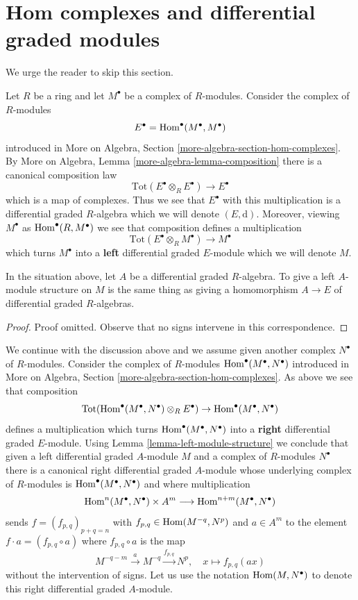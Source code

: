 \section{Hom complexes and differential graded modules}
\label{section-hom-complexes}

\noindent
We urge the reader to skip this section.

\medskip\noindent
Let $R$ be a ring and let $M^\bullet$ be a complex of $R$-modules.
Consider the complex of $R$-modules
$$
E^\bullet = \mathop{\mathrm{Hom}}\nolimits^\bullet(M^\bullet, M^\bullet)
$$
introduced in
More on Algebra, Section \ref{more-algebra-section-hom-complexes}.
By More on Algebra, Lemma \ref{more-algebra-lemma-composition}
there is a canonical composition law
$$
\text{Tot}(E^\bullet \otimes_R E^\bullet) \to E^\bullet
$$
which is a map of complexes. Thus we see that $E^\bullet$ with this
multiplication is a differential graded $R$-algebra which we will
denote $(E, \text{d})$. Moreover, viewing $M^\bullet$ as
$\mathop{\mathrm{Hom}}\nolimits^\bullet(R, M^\bullet)$ we see that composition defines a multiplication
$$
\text{Tot}(E^\bullet \otimes_R M^\bullet) \to M^\bullet
$$
which turns $M^\bullet$ into a {\bf left} differential graded $E$-module
which we will denote $M$.

\begin{lemma}
\label{lemma-left-module-structure}
In the situation above, let $A$ be a differential graded $R$-algebra.
To give a left $A$-module structure on $M$ is the same thing as
giving a homomorphism $A \to E$ of differential graded $R$-algebras.
\end{lemma}

\begin{proof}
Proof omitted. Observe that no signs intervene in this correspondence.
\end{proof}

\noindent
We continue with the discussion above and we assume given another
complex $N^\bullet$ of $R$-modules. Consider the complex
of $R$-modules $\mathop{\mathrm{Hom}}\nolimits^\bullet(M^\bullet, N^\bullet)$ introduced in
More on Algebra, Section \ref{more-algebra-section-hom-complexes}.
As above we see that composition
$$
\text{Tot}(\mathop{\mathrm{Hom}}\nolimits^\bullet(M^\bullet, N^\bullet) \otimes_R E^\bullet)
\to \mathop{\mathrm{Hom}}\nolimits^\bullet(M^\bullet, N^\bullet)
$$
defines a multiplication which turns $\mathop{\mathrm{Hom}}\nolimits^\bullet(M^\bullet, N^\bullet)$
into a {\bf right} differential graded $E$-module. Using
Lemma \ref{lemma-left-module-structure} we
conclude that given a left differential graded $A$-module $M$ and
a complex of $R$-modules $N^\bullet$ there is a canonical
right differential graded $A$-module whose underlying complex
of $R$-modules is $\mathop{\mathrm{Hom}}\nolimits^\bullet(M^\bullet, N^\bullet)$ and
where multiplication
$$
\mathop{\mathrm{Hom}}\nolimits^n(M^\bullet, N^\bullet) \times A^m \longrightarrow
\mathop{\mathrm{Hom}}\nolimits^{n + m}(M^\bullet, N^\bullet)
$$
sends $f = (f_{p, q})_{p + q = n}$ with $f_{p, q} \in \mathop{\mathrm{Hom}}\nolimits(M^{-q}, N^p)$
and $a \in A^m$ to the element $f \cdot a = (f_{p, q} \circ a)$ where
$f_{p, q} \circ a$ is the map
$$
M^{-q - m} \xrightarrow{a} M^{-q} \xrightarrow{f_{p, q}} N^p, \quad
x \longmapsto f_{p, q}(ax)
$$
without the intervention of signs. Let us use the notation
$\mathop{\mathrm{Hom}}\nolimits(M, N^\bullet)$ to denote this right differential graded $A$-module.

